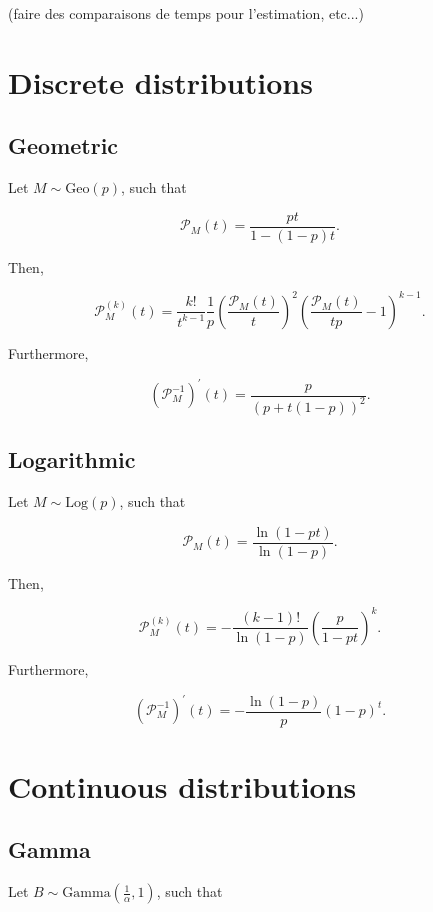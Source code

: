 \documentclass[11pt, english]{article}\usepackage[]{graphicx}\usepackage[]{color}
\begin{document}
(faire des comparaisons de temps pour l'estimation, etc...)

\newpage

\appendix

\section{Discrete distributions}

\subsection{Geometric}

Let $M \sim \mathrm{Geo}(p)$, such that

\begin{equation*}
  \mathcal{P}_M(t) = \frac{p t}{1 - (1 - p) t}.
\end{equation*}

Then,

$$ \mathcal{P}_M^{(k)}(t) = \frac{k!}{t^{k-1}} \frac{1}{p} \left(\frac{\mathcal{P}_M(t)}{t}\right)^2 \left(\frac{\mathcal{P}_M(t)}{t p} - 1\right)^{k - 1}. $$


Furthermore,

$$ \left(\mathcal{P}_M^{-1}\right)^\prime(t) = \frac{p}{(p + t (1 - p))^2}. $$

\subsection{Logarithmic}

Let $M \sim \mathrm{Log}(p)$, such that

$$ \mathcal{P}_M(t) = \frac{\ln(1 - pt)}{\ln(1 - p)}. $$

Then,

$$ \mathcal{P}_M^{(k)}(t) = -\frac{(k - 1)!}{\ln(1 - p)} \left(\frac{p}{1 - pt}\right)^k. $$

Furthermore,

$$ \left( \mathcal{P}_M^{-1} \right)^\prime (t) = -\frac{\ln(1 - p)}{p} (1 - p)^t. $$

\section{Continuous distributions}

\subsection{Gamma}

Let $B \sim \mathrm{Gamma}\left(\frac{1}{\alpha}, 1\right)$, such that
\end{document}
